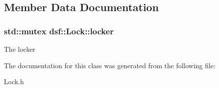 \subsection{Member Data Documentation}
\hypertarget{classdsf_1_1_lock_a605f27e33e37dc8b3b920a3272461c44}{}
\subsubsection[{locker}]{\setlength{\rightskip}{0pt plus 5cm}std\+::mutex dsf\+::\+Lock\+::locker\hspace{0.3cm}{\ttfamily [protected]}}\label{classdsf_1_1_lock_a605f27e33e37dc8b3b920a3272461c44}
The locker 

The documentation for this class was generated from the following file\+:\begin{DoxyCompactItemize}
\item 
Lock.\+h\end{DoxyCompactItemize}
